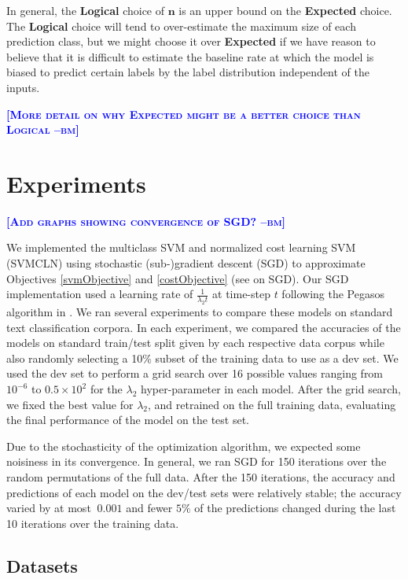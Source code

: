 \documentclass{article} %
\newcommand{\bmcomment}[1]{\textcolor{blue}{\textsc{\textbf{[#1 --bm]}}}}
\begin{document}
In general, the \textbf{Logical} choice of $\mathbf{n}$ is an upper
bound on the \textbf{Expected} choice.  The \textbf{Logical} choice
will tend to over-estimate the maximum size of each prediction class,
but we might choose it over \textbf{Expected} if we have reason
to believe that it is difficult to estimate the baseline rate at
which the model is biased to predict certain labels by the label
distribution independent of the inputs.

\bmcomment{More detail on why Expected might be a better 
choice than Logical}

\section{Experiments}

\bmcomment{Add graphs showing convergence of SGD?}

We implemented the multiclass SVM and normalized cost learning SVM (SVMCLN) 
using stochastic (sub-)gradient descent (SGD) to approximate Objectives
\ref{svmObjective} and \ref{costObjective} (see \citep{yin2003stochastic} on
SGD).  Our SGD implementation
used a learning rate of $\frac{1}{\lambda_2 t}$ at time-step $t$ 
following the Pegasos algorithm in \citep{shalev2011pegasos}.
We ran several experiments to compare these models on standard
text classification corpora.  In each experiment, we compared 
the accuracies of the models on standard train/test split 
given by each respective
data corpus while also randomly selecting a 10\% subset of the 
training data to use as a dev set.  We used the dev set to perform
a grid search over 16 possible values ranging from $10^{-6}$ to 
$0.5\times 10^2$ for the $\lambda_2$ hyper-parameter in each model.
After the grid search, we fixed the best value for $\lambda_2$,
and retrained on the full training data,
evaluating the final performance of the model on the test set.  
 
Due to the stochasticity of the optimization algorithm, we 
expected some noisiness in its convergence.  In general, we 
ran SGD for 150 iterations over the random permutations
of the full data. After the 150 iterations, the accuracy and 
predictions of each model on the dev/test sets were relatively 
stable; the accuracy varied by at most $~0.001$ and 
fewer $5\%$ of the predictions changed 
during the last 10 iterations over the training 
data. 

\subsection{Datasets}
\end{document}
